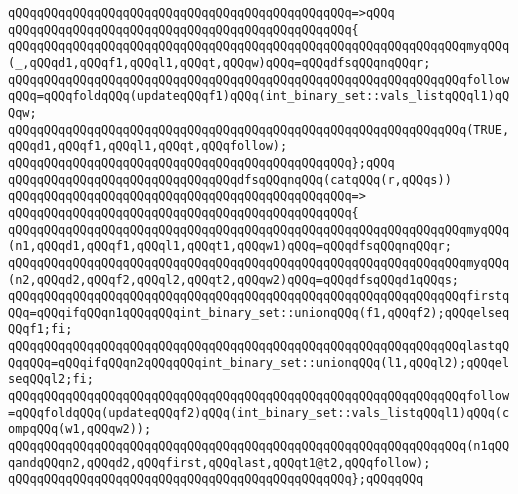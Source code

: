 \verb|qQQqqQQqqQQqqQQqqQQqqQQqqQQqqQQqqQQqqQQqqQQqqQQq=>qQQq|\newline
\verb|qQQqqQQqqQQqqQQqqQQqqQQqqQQqqQQqqQQqqQQqqQQqqQQq{|\newline
\verb|qQQqqQQqqQQqqQQqqQQqqQQqqQQqqQQqqQQqqQQqqQQqqQQqqQQqqQQqqQQqqQQqmyqQQq(_,qQQqd1,qQQqf1,qQQql1,qQQqt,qQQqw)qQQq=qQQqdfsqQQqnqQQqr;|\newline
\verb|qQQqqQQqqQQqqQQqqQQqqQQqqQQqqQQqqQQqqQQqqQQqqQQqqQQqqQQqqQQqqQQqfollowqQQq=qQQqfoldqQQq(updateqQQqf1)qQQq(int_binary_set::vals_listqQQql1)qQQqw;|\newline
\newline
\verb|qQQqqQQqqQQqqQQqqQQqqQQqqQQqqQQqqQQqqQQqqQQqqQQqqQQqqQQqqQQqqQQq(TRUE,qQQqd1,qQQqf1,qQQql1,qQQqt,qQQqfollow);|\newline
\verb|qQQqqQQqqQQqqQQqqQQqqQQqqQQqqQQqqQQqqQQqqQQqqQQq};qQQq|\newline
\newline
\verb|qQQqqQQqqQQqqQQqqQQqqQQqqQQqqQQqdfsqQQqnqQQq(catqQQq(r,qQQqs))|\newline
\verb|qQQqqQQqqQQqqQQqqQQqqQQqqQQqqQQqqQQqqQQqqQQqqQQq=>|\newline
\verb|qQQqqQQqqQQqqQQqqQQqqQQqqQQqqQQqqQQqqQQqqQQqqQQq{|\newline
\verb|qQQqqQQqqQQqqQQqqQQqqQQqqQQqqQQqqQQqqQQqqQQqqQQqqQQqqQQqqQQqqQQqmyqQQq(n1,qQQqd1,qQQqf1,qQQql1,qQQqt1,qQQqw1)qQQq=qQQqdfsqQQqnqQQqr;|\newline
\verb|qQQqqQQqqQQqqQQqqQQqqQQqqQQqqQQqqQQqqQQqqQQqqQQqqQQqqQQqqQQqqQQqmyqQQq(n2,qQQqd2,qQQqf2,qQQql2,qQQqt2,qQQqw2)qQQq=qQQqdfsqQQqd1qQQqs;|\newline
\newline
\verb|qQQqqQQqqQQqqQQqqQQqqQQqqQQqqQQqqQQqqQQqqQQqqQQqqQQqqQQqqQQqqQQqfirstqQQq=qQQqifqQQqn1qQQqqQQqint_binary_set::unionqQQq(f1,qQQqf2);qQQqelseqQQqf1;fi;|\newline
\verb|qQQqqQQqqQQqqQQqqQQqqQQqqQQqqQQqqQQqqQQqqQQqqQQqqQQqqQQqqQQqqQQqlastqQQqqQQq=qQQqifqQQqn2qQQqqQQqint_binary_set::unionqQQq(l1,qQQql2);qQQqelseqQQql2;fi;|\newline
\verb|qQQqqQQqqQQqqQQqqQQqqQQqqQQqqQQqqQQqqQQqqQQqqQQqqQQqqQQqqQQqqQQqfollow=qQQqfoldqQQq(updateqQQqf2)qQQq(int_binary_set::vals_listqQQql1)qQQq(compqQQq(w1,qQQqw2));|\newline
\newline
\verb|qQQqqQQqqQQqqQQqqQQqqQQqqQQqqQQqqQQqqQQqqQQqqQQqqQQqqQQqqQQqqQQq(n1qQQqandqQQqn2,qQQqd2,qQQqfirst,qQQqlast,qQQqt1@t2,qQQqfollow);|\newline
\verb|qQQqqQQqqQQqqQQqqQQqqQQqqQQqqQQqqQQqqQQqqQQqqQQq};qQQqqQQq|\newline
